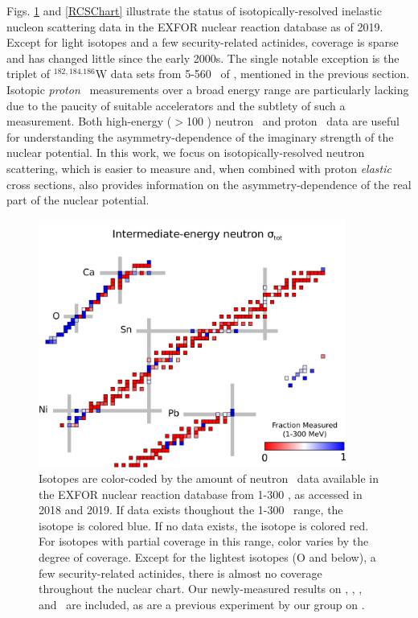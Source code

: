 Figs. \ref{TCSChart} and \ref{RCSChart} illustrate the status of isotopically-resolved inelastic
nucleon scattering data in the EXFOR nuclear reaction database as of 2019.
Except for light isotopes and a few security-related actinides, coverage is
sparse and has changed little since the early 2000s. The single notable
exception is the triplet of $^{182,184.186}$W data sets from 5-560 \mega\electronvolt\ of \cite{Dietrich2003}, 
mentioned in the previous section. Isotopic \textit{proton} \rxn\ measurements over
a broad energy range are particularly lacking due to the paucity of suitable
accelerators and the subtlety of such a measurement. 
Both high-energy ($>$100 \mega\electronvolt) neutron \tot\ and proton \rxn\ data are useful for
understanding the asymmetry-dependence of the imaginary strength of the nuclear potential.
In this work, we focus on isotopically-resolved neutron scattering, which
is easier to measure and, when combined with proton \textit{elastic} cross sections,
also provides information on the asymmetry-dependence of the real part of the nuclear potential.

\begin{figure}
    \centering
    \includegraphics[width=0.9\textwidth]{figures/TCSChart.png}
    \caption[Landscape of existing neutron \tot\ data in 2019]
    {Isotopes are color-coded by the amount of neutron \tot\ data available in the EXFOR nuclear
        reaction database from 1-300 \mega\electronvolt, as accessed in 2018 and 2019. If data exists thoughout the
        1-300 \mega\electronvolt\ range, the isotope
        is colored blue. If no data exists, the isotope is colored red. For
        isotopes with partial coverage in this range, color varies by the degree
        of coverage. Except for the lightest
        isotopes (O and below), a few security-related actinides, there is almost no coverage
        throughout the nuclear chart. Our newly-measured results on \oSixEight, \niEightFour,
        \rhThree, and \snTwelveFour\ are included, as are a previous experiment
        by our group on \caAughtEight \cite{Shane2010}.
    }
    \label{TCSChart}
\end{figure}

